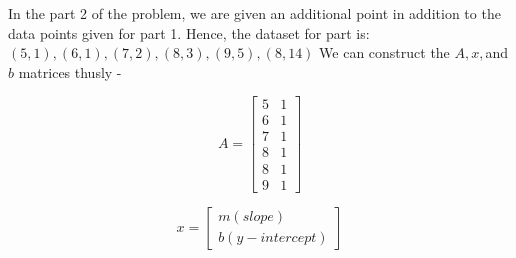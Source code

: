 \documentclass{article}
\begin{document}
In the part 2 of the problem, we are given an additional point in addition to the data points given for part 1. Hence, the dataset for part is:
$(5,1),(6,1),(7,2),(8,3),(9,5),(8,14) $
We can construct the $A,x, $and $b$ matrices thusly -

\begin{equation}\label{eqn14}
A = 
\begin{bmatrix}
 5&1\\6&1\\7&1\\8&1\\8&1\\9&1
\end{bmatrix}
\end{equation}

\begin{equation}\label{eqn15}
x = 
\begin{bmatrix}
m (slope) \\ b (y-intercept)
\end{bmatrix}
\end{equation}
\end{document}
